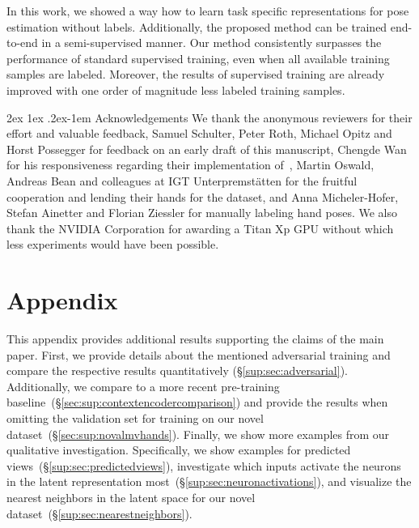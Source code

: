 \documentclass[10pt,twocolumn,letterpaper]{article}
\makeatletter
\renewcommand{\paragraph}{%
  \@startsection{paragraph}{4}%
  {\z@}{2ex \@plus 1ex \@minus .2ex}{-1em}%
  {\normalfont\normalsize\bfseries}%
}
\makeatother
\begin{document}
In this work, we showed a way how to learn task specific representations
for pose estimation without labels.
Additionally, the proposed method can be trained end-to-end in a semi-supervised manner.
Our method consistently surpasses the performance of standard supervised training, 
even when all available training samples are labeled.
Moreover, the results of supervised training are already improved with 
one order of magnitude less labeled training samples.



{
\paragraph{Acknowledgements}
We thank the anonymous reviewers for their effort and valuable feedback, 
Samuel Schulter, Peter Roth, Michael Opitz and Horst Possegger 
for feedback on an early draft of this manuscript, 
Chengde Wan for his responsiveness regarding their implementation 
of~\cite{Wan2017cvpr_crossingnets},
Martin Oswald, Andreas Bean and colleagues at IGT Unterpremst\"atten 
for the fruitful cooperation and lending their hands for the dataset, and
Anna Micheler-Hofer, Stefan Ainetter and Florian Ziessler 
for manually labeling hand poses.
We also thank the NVIDIA Corporation for awarding a Titan Xp GPU 
without which less experiments would have been possible.
}

{\small


}


\clearpage
{}
\setcounter{page}{1}
\appendix

\section{Appendix}
This appendix provides additional results 
supporting the claims of the main paper.
First, we provide details about the mentioned adversarial training and
compare the respective results quantitatively (\S\ref{sup:sec:adversarial}).
Additionally, we compare to a more recent pre-training 
baseline~(\S\ref{sec:sup:contextencodercomparison}) and 
provide the results when omitting the validation set for training on our novel 
dataset~(\S\ref{sec:sup:novalmvhands}).
Finally, we show more examples from our qualitative investigation.
Specifically, we show examples for predicted views~(\S\ref{sup:sec:predictedviews}),
investigate which inputs activate the neurons in the latent representation 
most~(\S\ref{sup:sec:neuronactivations}), 
and visualize the nearest neighbors in the latent space for our novel 
dataset~(\S\ref{sup:sec:nearestneighbors}).
\end{document}
